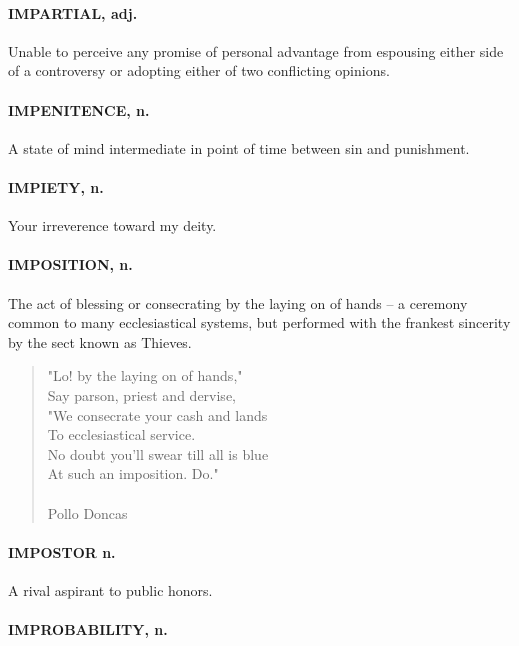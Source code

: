\documentclass[11pt]{article}
\begin{document}
\paragraph{IMPARTIAL, adj.}  Unable to perceive any promise of personal advantage
from espousing either side of a controversy or adopting either of two
conflicting opinions.

\paragraph{IMPENITENCE, n.}  A state of mind intermediate in point of time between
sin and punishment.

\paragraph{IMPIETY, n.}  Your irreverence toward my deity.

\paragraph{IMPOSITION, n.}  The act of blessing or consecrating by the laying on
of hands -- a ceremony common to many ecclesiastical systems, but
performed with the frankest sincerity by the sect known as Thieves.

\begin{quote}   "Lo! by the laying on of hands," \\
      Say parson, priest and dervise, \\
  "We consecrate your cash and lands \\
      To ecclesiastical service. \\
  No doubt you'll swear till all is blue \\
  At such an imposition.  Do." \\
 \\
Pollo Doncas \end{quote}


\paragraph{IMPOSTOR n.}  A rival aspirant to public honors.

\paragraph{IMPROBABILITY, n.}
\end{document}
